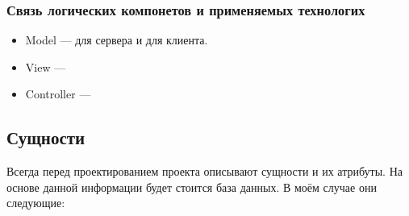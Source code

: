 \subsubsection{Связь логических компонетов и применяемых технологих}
\begin{itemize}
    \item Model --- \textcite{seqorm} для сервера и \textcite{redux} для клиента.
    \item View --- \textcite{react}
    \item Controller --- \textcite{express}
\end{itemize}

\subsection{Сущности}
Всегда перед проектированием проекта описывают сущности и их атрибуты. На основе данной информации будет стоится база данных. В моём случае они следующие:

